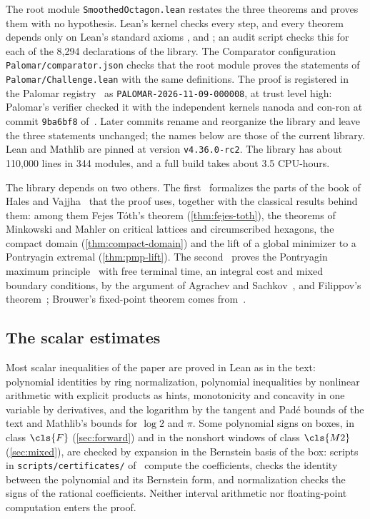 The root module \texttt{SmoothedOctagon.lean} restates the three theorems and proves them with no
hypothesis. Lean's kernel checks every step, and every theorem depends only on Lean's standard
axioms ,  and ; an audit script checks this
for each of the 8{,}294 declarations of the library. The Comparator configuration
\texttt{Palomar/comparator.json} checks that the root module proves the statements of
\texttt{Palomar/Challenge.lean} with the same definitions. The proof is registered in the Palomar
registry~\cite{Palomar} as \texttt{PALOMAR-2026-11-09-000008}, at trust level high: Palomar's
verifier checked it with the independent kernels nanoda and con-ron at commit
\texttt{9ba6bf8} of~\cite{Companion}. Later commits rename and reorganize the library and leave the
three statements unchanged; the names below are those of the current library. Lean and Mathlib are
pinned at version \texttt{v4.36.0-rc2}. The library has about 110{,}000 lines in 344 modules, and a
full build takes about 3.5 CPU-hours.

The library depends on two others. The first~\cite{SmoothedPolygonLean} formalizes the parts of
the book of Hales and Vajjha~\cite{HalesVajjha2024} that the proof uses, together with the classical
results behind them: among them Fejes T\'oth's theorem (\cref{thm:fejes-toth}), the theorems of
Minkowski and Mahler on critical lattices and circumscribed hexagons, the compact domain
(\cref{thm:compact-domain}) and the lift of a global minimizer to a Pontryagin extremal
(\cref{thm:pmp-lift}). The second~\cite{OptimalControlLean} proves the Pontryagin maximum
principle~\cite{Pontryagin1962} with free terminal time, an integral cost and mixed boundary
conditions, by the argument of Agrachev and Sachkov~\cite{AgrachevSachkov2004}, and Filippov's
theorem~\cite{Filippov1962}; Brouwer's fixed-point theorem comes from~\cite{FixedPointLean}.

\subsection{The scalar estimates}\label{app:formal-scalar}

Most scalar inequalities of the paper are proved in Lean as in the text: polynomial identities by
ring normalization, polynomial inequalities by nonlinear arithmetic with explicit products as
hints, monotonicity and concavity in one variable by derivatives, and the logarithm by the tangent
and Pad\'e bounds of the text and Mathlib's bounds for $\log2$ and $\pi$. Some polynomial signs on
boxes, in class $\cls{F}$ (\cref{sec:forward}) and in the nonshort windows of class $\cls{M2}$
(\cref{sec:mixed}), are checked by expansion in the Bernstein basis of the box: scripts in
\texttt{scripts/certificates/} of~\cite{Companion} compute the coefficients,  checks the
identity between the polynomial and its Bernstein form, and normalization checks the signs of the
rational coefficients. Neither interval arithmetic nor floating-point computation enters the
proof.

